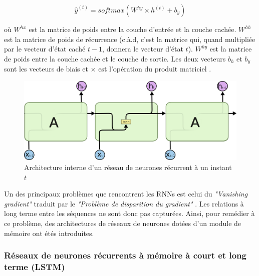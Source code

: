 \begin{equation}
\hat{y}^{(t)} = softmax(W^{hy} \times h^{(t)} + b_y)
\end{equation}

où $W^{hx}$ est la matrice de poids entre la couche d'entrée et la couche cachée. $W^{hh}$ est la matrice de poids de récurrence (c.à.d, c'est la matrice qui, quand multipliée par le vecteur d'état caché $t-1$, donnera le vecteur d'état $t$). $W^{hy}$ est la matrice de poids entre la couche cachée et le couche de sortie. Les deux vecteurs $b_h$ et $b_y$ sont les vecteurs de biais et $\times$ est l'opération du produit matriciel \citep{rnn_lstms}.

\begin{figure}[h]
	\centering
	
	\includegraphics[width=0.5\linewidth]{images/notions/rnns_unrolled_online.png}
	\caption{Architecture interne d'un réseau de neurones récurrent à un instant $t$ \citep{rnns_online}}
	\label{fig:simple_rnn}
\end{figure}
\par 
Un des principaux problèmes que rencontrent les RNNs est celui du \textit{"Vanishing gradient"} traduit par le \textit{"Problème de disparition du gradient"} \citep{vanishing_gradient}. Les relations à long terme entre les séquences ne sont donc pas capturées. Ainsi, pour remédier à ce problème, des architectures de réseaux de neurones dotées d'un module de mémoire ont étés introduites.

\subsubsection*{Réseaux de neurones récurrents à mémoire à court et long terme (LSTM)}

